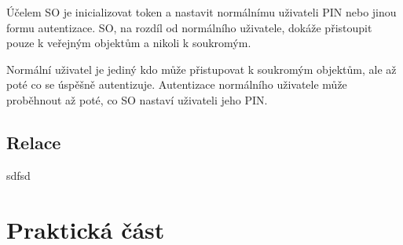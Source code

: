 \documentclass[]{fithesis3}
\begin{document}
		Účelem SO je inicializovat token a nastavit normálnímu uživateli PIN nebo jinou formu 				autentizace. SO, na rozdíl od normálního uživatele, dokáže přistoupit pouze k veřejným 			objektům a nikoli k soukromým.

		Normální uživatel je jediný kdo může přistupovat k soukromým objektům, ale až poté co	
		se úspěšně autentizuje. Autentizace normálního uživatele může proběhnout až poté, co SO 		nastaví uživateli jeho PIN.

		\subsection{Relace}

		sdfsd

	\section{Praktická část}
\end{document}
